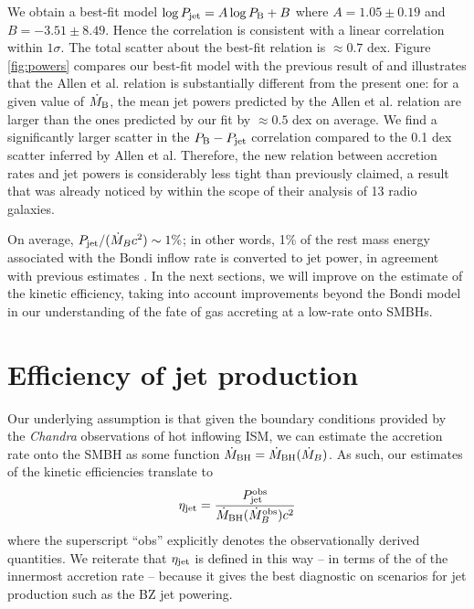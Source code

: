 \documentclass[useAMS,usenatbib]{mn2e}
\begin{document}
We obtain a best-fit model $\log P_{\rm jet} = A \log P_{\rm B} + B$ where $A=1.05 \pm 0.19$ and $B=-3.51 \pm 8.49$. Hence the correlation is consistent with a linear correlation within $1\sigma$. The total scatter about the best-fit relation 
is $\approx 0.7$ dex. 
Figure \ref{fig:powers} compares our best-fit model with the previous result of \cite{Allen06} and illustrates that the Allen et al. relation is substantially different from the present one: for a given value of $\dot{M}_{\rm B}$, the mean jet powers predicted by the Allen et al. relation are larger than the ones predicted by our fit by $\approx 0.5$ dex on average. We find a significantly larger scatter in the $P_{\rm B}-P_{\rm jet}$ correlation compared to the 0.1 dex scatter inferred by Allen et al. Therefore, the new relation between accretion rates and jet powers is considerably less tight than previously claimed, a result that was already noticed by \cite{Russell13} within the scope of their analysis of 13 radio galaxies. %

On average, $P_{\rm jet} / (\dot{M}_B c^2) \sim 1\%$; in other words, 1\% of the rest mass energy associated with the Bondi inflow rate is converted to jet power, in agreement with previous estimates \citep{Allen06,Merloni07,Balmaverde08}. In the next sections, we will improve on the estimate of the kinetic efficiency, taking into account improvements beyond the Bondi model in our understanding of the fate of gas accreting  at a low-rate onto SMBHs.




\section{Efficiency of jet production}	\label{sec:eff}

Our underlying assumption is that given the boundary conditions provided by the \emph{Chandra} observations of hot inflowing ISM, we can estimate the accretion rate onto the SMBH as some function $\dot{M}_{\rm BH} = \dot{M}_{\rm BH}(\dot{M}_B)$. As such, our estimates of the kinetic efficiencies translate to
\begin{equation}	\label{eq:eff}
\eta_{\rm jet} = \frac{P_{\rm jet}^{\rm obs}}{\dot{M}_{\rm BH}(\dot{M}_B^{\rm obs}) c^2}
\end{equation}
where the superscript ``obs'' explicitly denotes the observationally derived quantities. We reiterate that $\eta_{\rm jet}$ is defined in this way -- in terms of the of the innermost accretion rate -- because it gives the best diagnostic on scenarios for jet production such as the BZ jet powering.
\end{document}
